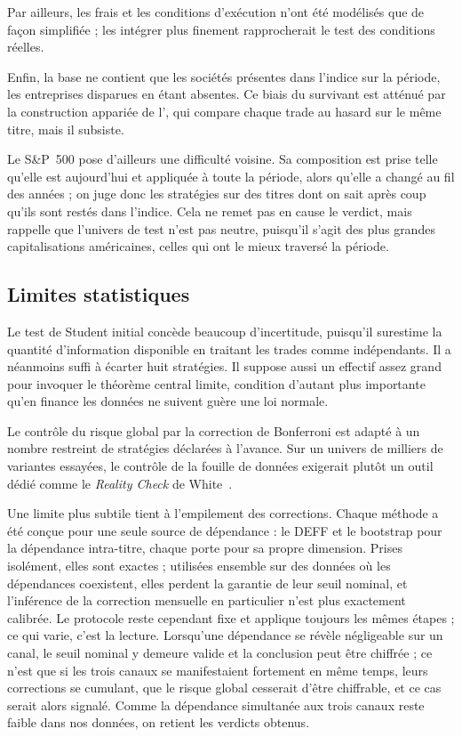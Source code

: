 Par ailleurs, les frais et les conditions d'exécution n'ont été modélisés que
de façon simplifiée ; les intégrer plus finement rapprocherait le test des
conditions réelles.

Enfin, la base ne contient que les sociétés présentes dans l'indice sur la
période, les entreprises disparues en étant absentes. Ce biais du survivant
est atténué par la construction appariée de l'\edgevar{}, qui compare chaque
trade au hasard sur le même titre, mais il subsiste.

Le S\&P~500 pose d'ailleurs une difficulté voisine. Sa composition est prise
telle qu'elle est aujourd'hui et appliquée à toute la période, alors qu'elle a
changé au fil des années ; on juge donc les stratégies sur des titres dont on
sait après coup qu'ils sont restés dans l'indice. Cela ne remet pas en cause
le verdict, mais rappelle que l'univers de test n'est pas neutre, puisqu'il
s'agit des plus grandes capitalisations américaines, celles qui ont le mieux
traversé la période.

\subsection*{Limites statistiques}

Le test de Student initial concède beaucoup d'incertitude, puisqu'il surestime
la quantité d'information disponible en traitant les trades comme indépendants.
Il a néanmoins suffi à écarter huit stratégies. Il suppose aussi un effectif
assez grand pour invoquer le théorème central limite, condition d'autant plus
importante qu'en finance les données ne suivent guère une loi normale.

Le contrôle du risque global par la correction de Bonferroni est adapté à un
nombre restreint de stratégies déclarées à l'avance. Sur un univers de milliers
de variantes essayées, le contrôle de la fouille de données exigerait plutôt un
outil dédié comme le \emph{Reality Check} de White~\cite{white2000}.

Une limite plus subtile tient à l'empilement des corrections. Chaque méthode a
été conçue pour une seule source de dépendance : le DEFF et le bootstrap pour
la dépendance intra-titre, chaque porte pour sa propre dimension. Prises
isolément, elles sont exactes ; utilisées ensemble sur des données où les
dépendances coexistent, elles perdent la garantie de leur seuil nominal, et
l'inférence de la correction mensuelle en particulier n'est plus exactement
calibrée. Le protocole reste cependant fixe et applique toujours les mêmes
étapes ; ce qui varie, c'est la lecture. Lorsqu'une dépendance se révèle
négligeable sur un canal, le seuil nominal y demeure valide et la conclusion
peut être chiffrée ; ce n'est que si les trois canaux se manifestaient
fortement en même temps, leurs corrections se cumulant, que le risque global
cesserait d'être chiffrable, et ce cas serait alors signalé. Comme la
dépendance simultanée aux trois canaux reste faible dans nos données, on
retient les verdicts obtenus.

